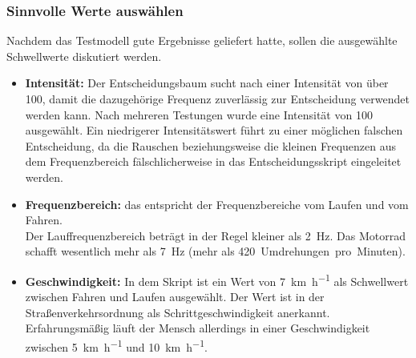 %
%




\subsubsection{Sinnvolle Werte auswählen}
Nachdem das Testmodell gute Ergebnisse geliefert hatte, sollen die ausgewählte Schwellwerte diskutiert werden.
\begin{itemize}
	\item \textbf{Intensität:} Der Entscheidungsbaum sucht nach einer Intensität von über 100, damit die dazugehörige Frequenz zuverlässig zur Entscheidung verwendet werden kann. Nach mehreren Testungen wurde eine Intensität von 100 ausgewählt. Ein niedrigerer Intensitätswert führt zu einer möglichen falschen Entscheidung, da die Rauschen beziehungsweise die kleinen Frequenzen aus dem Frequenzbereich fälschlicherweise in das Entscheidungsskript eingeleitet werden.
	\item \textbf{Frequenzbereich:} das entspricht der Frequenzbereiche vom Laufen und vom Fahren.\\
	Der Lauffrequenzbereich beträgt in der Regel kleiner als \SI{2}{\hertz}. Das Motorrad schafft wesentlich mehr als \SI{7}{\hertz} (mehr als \SI{420}{Umdrehungen pro Minuten}). 
	\item \textbf{Geschwindigkeit:} In dem Skript ist ein Wert von \SI[per-mode = symbol]{7}{\kilo\meter\per\hour} als Schwellwert zwischen Fahren und Laufen ausgewählt. Der Wert ist in der Straßenverkehrsordnung als Schrittgeschwindigkeit anerkannt\citep{Bussgeldkataloge2022}. Erfahrungsmäßig läuft der Mensch allerdings in einer Geschwindigkeit zwischen \SI[per-mode = symbol]{5}{\kilo\meter\per\hour} und \SI[per-mode = symbol]{10}{\kilo\meter\per\hour}.
\end{itemize}




